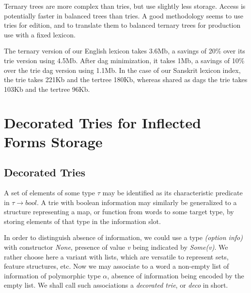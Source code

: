 \vspace*{15pt}
Ternary trees are more complex than tries, but use slightly less storage.
Access is potentially faster in balanced trees than tries. 
A good methodology seems to use tries for edition, and to translate them
to balanced ternary trees for production use with a fixed lexicon.

The ternary version of our English lexicon takes 3.6Mb, a savings of 20\%
over its trie version using 4.5Mb. After dag minimization, it takes 1Mb,
a savings of 10\% over the trie dag version using 1.1Mb. 
In the case of our Sanskrit lexicon index, the trie takes 221Kb and the tertree
180Kb, whereas shared as dags the trie takes 103Kb and the tertree 96Kb.

\section{Decorated Tries for Inflected Forms Storage}

\subsection{Decorated Tries}

A set of elements of some type $\tau$ may be identified as its
characteristic predicate in $\tau\rightarrow bool$. A trie with boolean 
information may similarly be generalized to a structure
representing a map, or function from words to some target type, by storing
elements of that type in the information slot. 

In order to distinguish absence of information, we could use a type
{\sl (option info)} with constructor {\sl None}, presence of value
{\sl v} being indicated by {\sl Some(v)}. We rather 
choose here a variant with lists,
which are versatile to represent sets, feature structures, etc. Now we
may associate to a word a non-empty list of information of polymorphic
type $\alpha$, absence of information being encoded by the empty list.
We shall call such associations a {\sl decorated trie}, or 
{\sl deco} in short.
